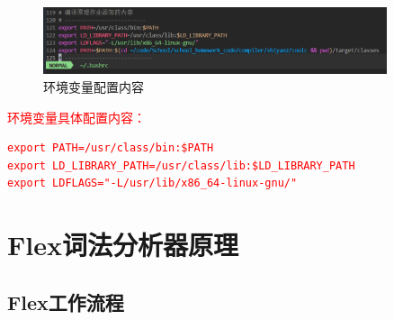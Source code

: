\documentclass[twocolumn]{article}
\begin{document}
\begin{figure}[htbp]
    \centering
    \includegraphics[width=0.9\textwidth]{env.png}
    \caption{环境变量配置内容}
    \label{fig:env_config}
\end{figure}

\textcolor{red}{
环境变量具体配置内容：
\begin{verbatim}
export PATH=/usr/class/bin:$PATH
export LD_LIBRARY_PATH=/usr/class/lib:$LD_LIBRARY_PATH  
export LDFLAGS="-L/usr/lib/x86_64-linux-gnu/"
\end{verbatim}
}

\section{Flex词法分析器原理}

\subsection{Flex工作流程}
\end{document}
